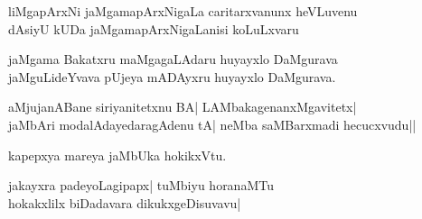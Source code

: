 \begin{entry}
\end{entry}

\begin{entry}
\gl{}
\begin{shl}
liMgapArxNi jaMgamapArxNigaLa caritarxvanunx heVLuvenu\\
dAsiyU kUDa jaMgamapArxNigaLanisi koLuLxvaru
\end{shl}
\end{entry}

\begin{entry}
\begin{shl}
jaMgama Bakatxru maMgagaLAdaru huyayxlo DaMgurava\\
jaMguLideYvava pUjeya mADAyxru huyayxlo DaMgurava.
\end{shl}
\end{entry}

\begin{entry}
\begin{shl}
aMjujanABane siriyanitetxnu BA| LAMbakagenanxMgavitetx|\\
jaMbAri modalAdayedaragAdenu tA| neMba saMBarxmadi hecucxvudu||
\end{shl}
\end{entry}

\begin{entry}
\begin{shl}
kapepxya mareya jaMbUka hokikxVtu.
\end{shl}
\end{entry}

\begin{entry}
\end{entry}

\begin{entry}
\begin{shl}
jakayxra padeyoLagipapx| tuMbiyu horanaMTu\\
hokakxlilx biDadavara dikukxgeDisuvavu|
\end{shl}
\end{entry}

